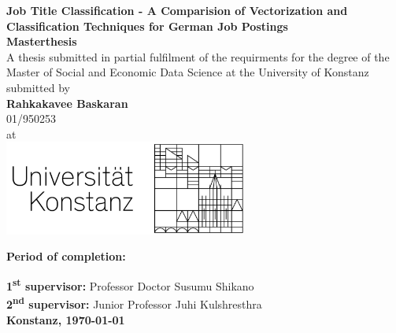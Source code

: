 \documentclass[12pt, a4paper, titlepage]{article}
\begin{document}
\begin{titlepage}
    \begin{center}
    {\LARGE \textbf{Job Title Classification - A Comparision of Vectorization and Classification Techniques for German Job Postings}}
    \\[1cm]
    {\Large \textbf{Masterthesis}}
    \\[1cm]
    {\normalsize A thesis submitted in partial fulfilment of the requirments for the degree of the Master of Social and Economic Data Science at the University of Konstanz}
    \\[1cm]
    {\Large submitted by}
    \\[0.5cm]
    {\LARGE \textbf{Rahkakavee Baskaran}}
    \\[0.5cm]
    {\LARGE 01/950253}
    \\[0.5cm]
    {\Large at}
    \\[0.5cm]
    \includegraphics[width=0.6\textwidth]{logo.jpg}
  \end{center}
  {\normalsize \textbf{Period of completion: }} 
  \\[0.2cm]
  \begin{center}
  {\normalsize \textbf{1\textsuperscript{st} supervisor:} Professor Doctor Susumu Shikano}
  \\[0.1cm]
  {\normalsize \textbf{2\textsuperscript{nd} supervisor:} Junior Professor Juhi Kulshresthra}
  \\[2cm]
    {\LARGE \textbf{Konstanz, \today}}
  \end{center}
    \end{titlepage}

\tableofcontents
\newpage
\listoffigures
\newpage
\listoftables
\newpage
\end{document}
